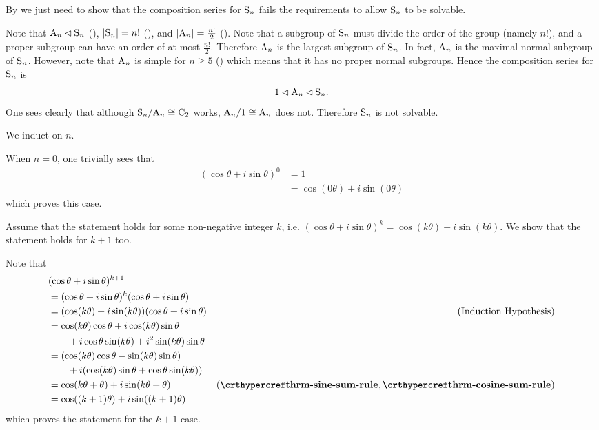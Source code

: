 \begin{questions}
    \item By  we just need to show that the composition series for $\mathrm{S}_{n}$ fails the requirements to allow $\mathrm{S}_{n}$ to be solvable.

    Note that $\mathrm{A}_{n} \lhd \mathrm{S}_{n}$ (), $|\mathrm{S}_{n}| = n!$ (), and $|\mathrm{A}_{n}| = \frac{n!}2$ (). Note that a subgroup of $\mathrm{S}_{n}$ must divide the order of the group (namely $n!$), and a proper subgroup can have an order of at most $\frac{n!}2$. Therefore $\mathrm{A}_{n}$ is the largest subgroup of $\mathrm{S}_{n}$. In fact, $\mathrm{A}_{n}$ is the maximal normal subgroup of $\mathrm{S}_{n}$. However, note that $\mathrm{A}_{n}$ is simple for $n \geq 5$ () which means that it has no proper normal subgroups. Hence the composition series for $\mathrm{S}_{n}$ is
    \[
        1 \lhd \mathrm{A}_{n} \lhd \mathrm{S}_{n}.
    \]
    One sees clearly that although $\mathrm{S}_{n}/\mathrm{A}_{n} \cong \mathrm{C}_{2}$ works, $\mathrm{A}_{n}/1 \cong \mathrm{A}_{n}$ does not. Therefore $\mathrm{S}_{n}$ is not solvable.

    \item \begin{partquestions}{\roman*}
        \item We induct on $n$.

        When $n = 0$, one trivially sees that
        \begin{align*}
            (\cos\theta + i\sin\theta)^0 &= 1\\
            &= \cos(0\theta) + i\sin(0\theta)
        \end{align*}
        which proves this case.

        Assume that the statement holds for some non-negative integer $k$, i.e. $(\cos\theta + i\sin\theta)^k = \cos(k\theta) + i\sin(k\theta)$. We show that the statement holds for $k+1$ too.

        Note that
        \begin{align*}
            &(\cos\theta + i\sin\theta)^{k+1}\\
            &= (\cos\theta + i\sin\theta)^k(\cos\theta + i\sin\theta)\\
            &= (\cos(k\theta) + i\sin(k\theta))(\cos\theta + i\sin\theta) & (\text{Induction Hypothesis})\\
            &= \cos(k\theta)\cos\theta + i\cos(k\theta)\sin\theta\\
            &\quad\quad+ i\cos\theta\sin(k\theta) + i^2\sin(k\theta)\sin\theta\\
            &= (\cos(k\theta)\cos\theta - \sin(k\theta)\sin\theta)\\
            &\quad\quad+ i(\cos(k\theta)\sin\theta + \cos\theta\sin(k\theta))\\
            &= \cos(k\theta+\theta) + i\sin(k\theta+\theta) & (\myref{thrm-sine-sum-rule}, \myref{thrm-cosine-sum-rule})\\
            &= \cos((k+1)\theta) + i\sin((k+1)\theta)
        \end{align*}
        which proves the statement for the $k + 1$ case.


\end{partquestions}
\end{questions}
